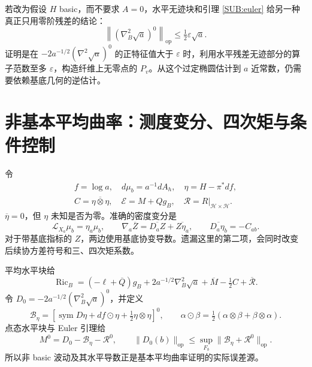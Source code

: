 \documentclass[UTF8,fontset=fandol,zihao=-4,oneside,openany]{ctexbook}
\theoremstyle{cjkplain}
\numberwithin{equation}{chapter}
\begin{document}
若改为假设 $H$ basic，而不要求 $A=0$，水平无迹块和引理 \ref{SUB:euler} 给另一种真正只用零阶残差的结论：
\begin{equation}\label{SUB:basic-hessian}
\left\|(\nabla_B^2\sqrt a)^0\right\|_{\mathrm{op}}
\le\tfrac12\varepsilon\sqrt a.
\end{equation}
证明是在 $-2a^{-1/2}(\nabla^2\sqrt a)^0$ 的正特征值大于 $\varepsilon$ 时，利用水平残差无迹部分的算子范数至多 $\varepsilon$，构造纤维上无零点的 $P_v$。从这个过定椭圆估计到 $a$ 近常数，仍需要依赖基底几何的逆估计。

\section{非基本平均曲率：测度变分、四次矩与条件控制}

令
\begin{equation}\label{SUB:centered}
\begin{gathered}
f=\log a,\quad d\mu_b=a^{-1}dA_h,\quad
\eta=H-\pi^*df,\\
C=\overline{\eta\otimes\eta},\quad
\mathcal E=M+Qg_B,\quad\mathcal R=R|_{\mathcal H\times\mathcal H}.
\end{gathered}
\end{equation}
$\overline\eta=0$，但 $\eta$ 未知是否为零。准确的密度变分是
\begin{equation}\label{SUB:measure}
\mathcal L_{X_a}\mu_b=\eta_a\mu_b,\qquad
\nabla_a\overline Z=\overline{D_aZ}+\overline{Z\eta_a},
\qquad\overline{D_a\eta_b}=-C_{ab}.
\end{equation}
对于带基底指标的 $Z$，两边使用基底协变导数。遗漏这里的第二项，会同时改变后续协方差符号和三、四次矩系数。

平均水平块给
\begin{equation}\label{SUB:averaged-horizontal}
\operatorname{Ric}_B=(-\ell+\overline Q)g_B
+2a^{-1/2}\nabla_B^2\sqrt a+\overline M
-\tfrac12C+\overline{\mathcal R}.
\end{equation}
令 $D_0=-2a^{-1/2}(\nabla_B^2\sqrt a)^0$，并定义
\[
\mathcal B_\eta=
[\operatorname{sym}D\eta+df\odot\eta+\tfrac12\eta\otimes\eta]^0,
\qquad \alpha\odot\beta=\tfrac12(\alpha\otimes\beta+\beta\otimes\alpha).
\]
点态水平块与 Euler 引理给
\begin{equation}\label{SUB:quant-euler}
M^0=D_0-\mathcal B_\eta-\mathcal R^0,
\qquad
\|D_0(b)\|_{\mathrm{op}}
\le\sup_{F_b}\|\mathcal B_\eta+\mathcal R^0\|_{\mathrm{op}}.
\end{equation}
所以非 basic 波动及其水平导数正是基本平均曲率证明的实际误差源。
\end{document}
